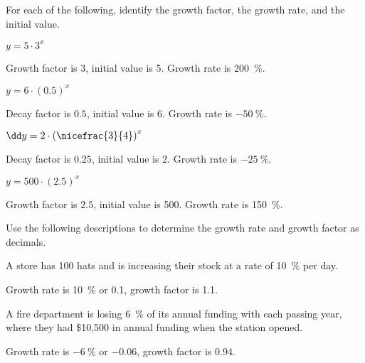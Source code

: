 \begin{exercises}
\begin{problem}
For each of the following, identify the growth factor, the growth rate, and the initial value.
\begin{multicols}{2}
	\begin{subproblem}
		$y=5\cdot 3^x$
		\begin{shortsolution}
			Growth factor is $3$, initial value is 5.  Growth rate is \SI{200}{\percent}.
		\end{shortsolution}
	\end{subproblem}
	\begin{subproblem}
		$y=6\cdot (0.5)^x$
		\begin{shortsolution}
			Decay factor is $0.5$, initial value is 6.  Growth rate is $\SI{-50}{\percent}$.
		\end{shortsolution}
	\end{subproblem}
	\begin{subproblem}
		$\dd y=2\cdot \left(\nicefrac{3}{4}\right)^x$
		\begin{shortsolution}
			Decay factor is $0.25$, initial value is 2.  Growth rate is $\SI{-25}{\percent}$.
		\end{shortsolution}
	\end{subproblem}
	\begin{subproblem}
		$y=500\cdot (2.5)^x$
		\begin{shortsolution}
			Growth factor is $2.5$, initial value is 500.  Growth rate is \SI{150}{\percent}.
		\end{shortsolution}
	\end{subproblem}
\end{multicols}
\end{problem}

\begin{problem}
Use the following descriptions to determine the growth rate and growth factor as decimals.
\begin{subproblem}
	A store has 100 hats and is increasing their stock at a rate of \SI{10}{\percent} per day.
	\begin{shortsolution}
		Growth rate is \SI{10}{\percent} or 0.1, growth factor is 1.1.
	\end{shortsolution}
\end{subproblem}
\begin{subproblem}
	A fire department is losing \SI{6}{\percent} of its annual funding with each passing year, where they had \$10,500 in annual funding when the station opened. 
	\begin{shortsolution}
		Growth rate is $\SI{-6}{\percent}$ or $-0.06$, growth factor is $0.94$.
	\end{shortsolution}
\end{subproblem}
\end{problem}




\end{exercises}
